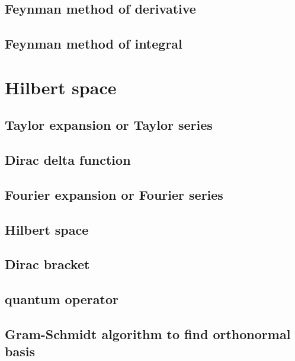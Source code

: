 \documentclass[
]{book}
\theoremstyle{definition}
\theoremstyle{definition}
\theoremstyle{definition}
\theoremstyle{definition}
\theoremstyle{remark}
\begin{document}
\section{Feynman method of derivative}\label{feynman-method-of-derivative}

\section{Feynman method of integral}\label{feynman-method-of-integral}

\chapter{Hilbert space}\label{hilbert-space}

\section{Taylor expansion or Taylor series}\label{taylor-expansion-or-taylor-series}

\section{Dirac delta function}\label{dirac-delta-function}

\section{Fourier expansion or Fourier series}\label{fourier-expansion-or-fourier-series}

\section{Hilbert space}\label{hilbert-space-1}

\section{Dirac bracket}\label{dirac-bracket}

\section{quantum operator}\label{quantum-operator}

\section{Gram-Schmidt algorithm to find orthonormal basis}\label{gram-schmidt-algorithm-to-find-orthonormal-basis}
\end{document}
